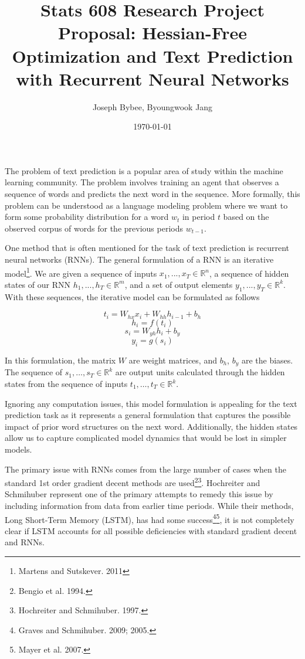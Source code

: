 \documentclass{article}
\begin{document}
\title{Stats 608 Research Project Proposal: Hessian-Free Optimization and Text Prediction with Recurrent Neural Networks}
\author{Joseph Bybee, Byoungwook Jang}
\date{\today}

\maketitle

The problem of text prediction is a popular area of study within the machine learning community.  The problem involves training an agent that observes a sequence of words and predicts the next word in the sequence. More formally, this problem can be understood as a language modeling problem where we want to form some probability distribution for a word $w_t$ in period $t$ based on the observed corpus of words for the previous periods $w_{t-1}$.

One method that is often mentioned for the task of text prediction is recurrent neural networks (RNNs).  The general formulation of a RNN is an iterative model\footnote{Martens and Sutskever. 2011}. We are given a sequence of inputs $x_1,...,x_T \in \mathbb{R}^n$, a sequence of hidden states of our RNN $h_1,...,h_T \in \mathbb{R}^m$, and a set of output elements $y_1,...,y_T \in \mathbb{R}^k$.  With these sequences, the iterative model can be formulated as follows

$$t_i = W_{hx} x_i + W_{hh} h_{i-1} + b_h$$
$$h_i = f(t_i)$$
$$s_i = W_{yh} h_i + b_y$$
$$y_i = g(s_i)$$

In this formulation, the matrix $W$ are weight matrices, and $b_h$, $b_y$ are the biases. The sequence of $s_1, \dots, s_T \in \mathbb{R}^k$ are output units calculated through the hidden states from the sequence of inputs $t_1, \dots, t_T \in \mathbb{R}^k$.

Ignoring any computation issues, this model formulation is appealing for the text prediction task as it represents a general formulation that captures the possible impact of prior word structures on the next word.  Additionally, the hidden states allow us to capture complicated model dynamics that would be lost in simpler models.

The primary issue with RNNs comes from the large number of cases when the standard 1st order gradient decent methods are used\footnote{Bengio et al. 1994.}\footnote{Hochreiter and Schmihuber. 1997.}.  Hochreiter and Schmihuber represent one of the primary attempts to remedy this issue by including information from data from earlier time periods.  While their methods, Long Short-Term Memory (LSTM), has had some success\footnote{Graves and Schmihuber. 2009; 2005.}\footnote{Mayer et al. 2007.}, it is not completely clear if LSTM accounts for all possible deficiencies with standard gradient decent and RNNs.
\end{document}
